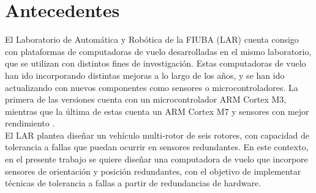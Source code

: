\section{Antecedentes}

El Laboratorio de Automática y Robótica de la FIUBA (LAR) cuenta consigo con plataformas de computadoras de vuelo desarrolladas en el mismo laboratorio, que se utilizan con distintos fines de investigación. Estas computadoras de vuelo han ido incorporando distintas mejoras a lo largo de los años, y se han ido actualizando con nuevos componentes como sensores o microcontroladores. La primera de las versiones cuenta con un microcontrolador ARM Cortex M3, mientras que la última de estas cuenta un ARM Cortex M7 y sensores con mejor rendimiento \cite{garberoglio2019diseno}.\\


El LAR plantea diseñar un vehículo multi-rotor de seis rotores, con capacidad de tolerancia a fallas que puedan ocurrir en sensores redundantes. En este contexto, en el presente trabajo se quiere diseñar una computadora de vuelo que incorpore sensores de orientación y posición redundantes, con el objetivo de implementar técnicas de tolerancia a fallas a partir de redundancias de hardware.






